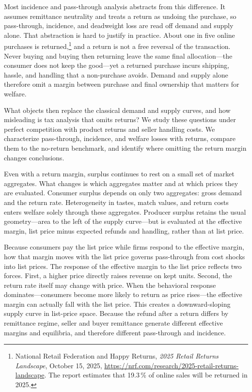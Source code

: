 \documentclass[11pt]{article}
\begin{document}
Most incidence and pass-through analysis abstracts from this difference.  It
assumes remittance neutrality and treats a return as undoing the purchase, so
pass-through, incidence, and deadweight loss are read off demand and supply
alone.  That abstraction is hard to justify in practice.  About one in five
online purchases is
returned,\footnote{National Retail Federation and Happy Returns, \emph{2025
  Retail Returns Landscape}, October 15, 2025,
  \url{https://nrf.com/research/2025-retail-returns-landscape}.
  The report estimates that 19.3\,\% of online sales will be returned in 2025.}
and a return is not a free reversal of the transaction.  Never buying and buying then returning leave the same final
allocation---the consumer does not keep the good---yet a returned purchase
incurs shipping, hassle, and handling that a non-purchase avoids.  Demand and
supply alone therefore omit a margin between purchase and final ownership that
matters for welfare.

What objects then replace the classical demand and supply curves, and how
misleading is tax analysis that omits returns?  We study these questions
under perfect competition with product returns and seller handling costs.
We characterize pass-through, incidence, and welfare losses with returns,
compare them to the no-return benchmark, and identify where omitting the
return margin changes conclusions.

Even with a return margin, surplus continues to rest on a small set of market
aggregates.  What changes is which aggregates matter and at which prices they
are evaluated.  Consumer surplus depends on only two aggregates: gross demand
and the return rate.  Heterogeneity in tastes, match values, and return costs
enters welfare solely through these aggregates.  Producer surplus retains the
usual geometry---area to the left of the supply curve---but is evaluated at
the effective margin, list price minus expected refunds and handling, rather
than at list price.

Because consumers pay the list price while firms respond to the effective
margin, how that margin moves with the list price governs pass-through from
cost shocks into list prices.  The response of the effective margin to the
list price reflects two forces.  First, a higher price directly raises
revenue on kept units.  Second, the return rate itself may change with price.
When the behavioral response dominates---consumers become more likely to return
as price rises---the effective margin can actually fall with the list price.
This creates a downward-sloping supply curve in list-price space.  Because the
refund after a return differs by remittance regime, seller and buyer remittance
generate different effective margins and equilibria, and therefore different
pass-through and incidence.
\end{document}
